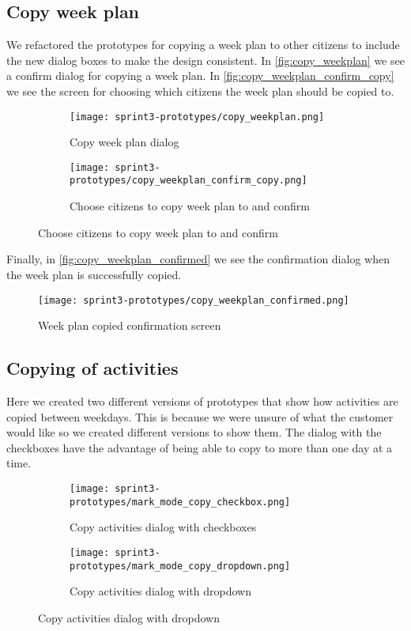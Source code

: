 \subsection{Copy week plan}
We refactored the prototypes for copying a week plan to other citizens to include the new dialog boxes to make the design consistent. In \autoref{fig:copy_weekplan} we see a confirm dialog for copying a week plan. In \autoref{fig:copy_weekplan_confirm_copy} we see the screen for choosing which citizens the week plan should be copied to. 
\begin{figure}[H]
    \begin{subfigure}{0.5\textwidth}
    \texttt{[image: sprint3-prototypes/copy\_weekplan.png]} 
    \caption{Copy week plan dialog}
    \label{fig:copy_weekplan}
    \end{subfigure}
    \begin{subfigure}{0.5\textwidth}
        \texttt{[image: sprint3-prototypes/copy\_weekplan\_confirm\_copy.png]}
    \caption{Choose citizens to copy week plan to and confirm}
    \label{fig:copy_weekplan_confirm_copy}
    \end{subfigure} 
\end{figure}
Finally, in \autoref{fig:copy_weekplan_confirmed} we see the confirmation dialog when the week plan is successfully copied.

\begin{figure}
    \centering
    \texttt{[image: sprint3-prototypes/copy\_weekplan\_confirmed.png]} 
    \caption{Week plan copied confirmation screen}
    \label{fig:copy_weekplan_confirmed}
\end{figure}

\subsection{Copying of activities}
Here we created two different versions of prototypes that show how activities are copied between weekdays. This is because we were unsure of what the customer would like so we created different versions to show them. The dialog with the checkboxes have the advantage of being able to copy to more than one day at a time.
\begin{figure}[H]
    \begin{subfigure}{0.5\textwidth}
    \texttt{[image: sprint3-prototypes/mark\_mode\_copy\_checkbox.png]} 
    \caption{Copy activities dialog with checkboxes}
    \label{fig:mark_mode_copy_checkbox}
    \end{subfigure}
    \begin{subfigure}{0.5\textwidth}
        \texttt{[image: sprint3-prototypes/mark\_mode\_copy\_dropdown.png]}
    \caption{Copy activities dialog with dropdown}
    \label{fig:mark_mode_copy_dropdown}
    \end{subfigure} 
\end{figure}

